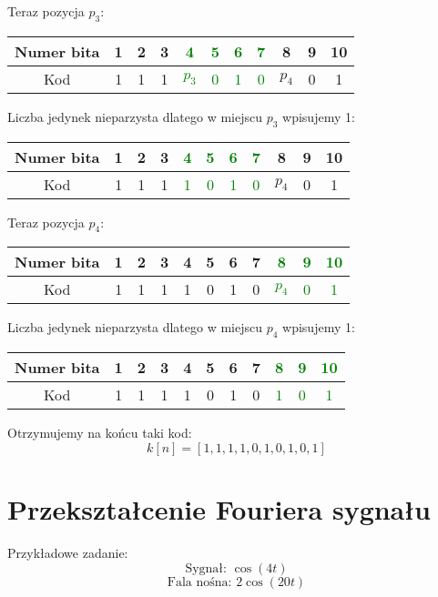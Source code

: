 \documentclass{article}
\begin{document}
Teraz pozycja $p_3$:
\begin{center}
        \begin{tabular}{|c|c|c|c|c|c|c|c|c|c|c|}
        \hline
        Numer bita & 1 & 2 & 3 & \textcolor{green}{4} & \textcolor{green}{5} & \textcolor{green}{6} & \textcolor{green}{7} & 8 & 9 & 10 \\
        \hline
        Kod & 1 & 1 & 1 & \textcolor{green}{$p_3$} & \textcolor{green}{0} & \textcolor{green}{1} & \textcolor{green}{0} & $p_4$ & 0 & 1 \\
        \hline
    \end{tabular}
\end{center}
Liczba jedynek nieparzysta dlatego w miejscu $p_3$ wpisujemy 1:
\begin{center}
        \begin{tabular}{|c|c|c|c|c|c|c|c|c|c|c|}
        \hline
        Numer bita & 1 & 2 & 3 & \textcolor{green}{4} & \textcolor{green}{5} & \textcolor{green}{6} & \textcolor{green}{7} & 8 & 9 & 10 \\
        \hline
        Kod & 1 & 1 & 1 & \textcolor{green}{1} & \textcolor{green}{0} & \textcolor{green}{1} & \textcolor{green}{0} & $p_4$ & 0 & 1 \\
        \hline
    \end{tabular}
\end{center}
Teraz pozycja $p_4$:
\begin{center}
        \begin{tabular}{|c|c|c|c|c|c|c|c|c|c|c|}
        \hline
        Numer bita & 1 & 2 & 3 & 4 & 5 & 6 & 7 & \textcolor{green}{8} & \textcolor{green}{9} & \textcolor{green}{10} \\
        \hline
        Kod & 1 & 1 & 1 & 1 & 0 & 1 & 0 & \textcolor{green}{$p_4$} & \textcolor{green}{0} & \textcolor{green}{1} \\
        \hline
    \end{tabular}
\end{center}
Liczba jedynek nieparzysta dlatego w miejscu $p_4$ wpisujemy 1:
\begin{center}
        \begin{tabular}{|c|c|c|c|c|c|c|c|c|c|c|}
        \hline
        Numer bita & 1 & 2 & 3 & 4 & 5 & 6 & 7 & \textcolor{green}{8} & \textcolor{green}{9} & \textcolor{green}{10} \\
        \hline
        Kod & 1 & 1 & 1 & 1 & 0 & 1 & 0 & \textcolor{green}{1} & \textcolor{green}{0} & \textcolor{green}{1} \\
        \hline
    \end{tabular}
\end{center}
Otrzymujemy na końcu taki kod:
\[
    k[n]=[1,1,1,1,0,1,0,1,0,1]
\]

\section{Przekształcenie Fouriera sygnału}
Przykładowe zadanie:
\[
    \text{Sygnał: }\cos (4t)
\]
\[
    \text{Fala nośna: }2 \cos(20t)
\]
\end{document}
